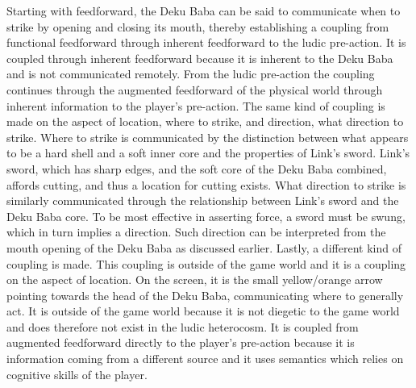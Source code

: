 Starting with feedforward, the Deku Baba can be said to communicate when to strike by opening and closing its mouth, thereby establishing a coupling from functional feedforward through inherent feedforward to the ludic pre-action. It is coupled through inherent feedforward because it is inherent to the Deku Baba and is not communicated remotely. From the ludic pre-action the coupling continues through the augmented feedforward of the physical world through inherent information to the player's pre-action. The same kind of coupling is made on the aspect of location, where to strike, and direction, what direction to strike. Where to strike is communicated by the distinction between what appears to be a hard shell and a soft inner core and the properties of Link's sword. Link's sword, which has sharp edges, and the soft core of the Deku Baba combined, affords cutting, and thus a location for cutting exists. What direction to strike is similarly communicated through the relationship between Link's sword and the Deku Baba core. To be most effective in asserting force, a sword must be swung, which in turn implies a direction. Such direction can be interpreted from the mouth opening of the Deku Baba as discussed earlier. Lastly, a different kind of coupling is made. This coupling is outside of the game world and it is a coupling on the aspect of location. On the screen, it is the small yellow/orange arrow pointing towards the head of the Deku Baba, communicating where to generally act. It is outside of the game world because it is not diegetic to the game world and does therefore not exist in the ludic heterocosm. It is coupled from augmented feedforward directly to the player's pre-action because it is information coming from a different source and it uses semantics which relies on cognitive skills of the player.

